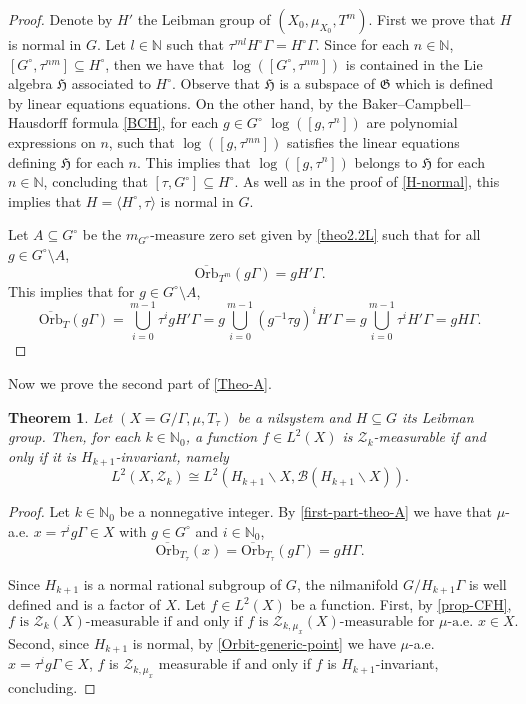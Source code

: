\documentclass[letter, 11pt]{article}
\newtheorem{theorem}{Theorem}[section]
\theoremstyle{definition}
\theoremstyle{plain}
\newcommand{\N}{\mathbb{N}}
\newcommand{\1}{\mathbbm{1}}
\begin{document}
\begin{proof}
Denote by $H'$ the Leibman group of $(X_0,\mu_{X_0},T^m)$. First we prove that $H$ is normal in $G$. Let $l\in \N$ such that $\tau^{ml}H^{\circ}\Gamma =H^{\circ}\Gamma$. Since for each $n\in \N$, $[G^{\circ},\tau^{nm}]\subseteq H^{\circ}$, then we have that $\log([G^{\circ},\tau^{nm}])$ is contained in the Lie algebra $\mathfrak{H}$ associated to $H^{\circ}$. Observe that $\mathfrak{H}$ is a subspace of $\mathfrak{G}$ which is defined by linear equations equations. On the other hand, by the Baker–Campbell–Hausdorff formula \cref{BCH}, for each $g\in G^{\circ}$ 
$\log([g,\tau^{n}])$ are polynomial expressions on $n$, such that $\log([g,\tau^{mn}])$ satisfies the linear equations defining $\mathfrak{H}$ for each $n$. This implies that $\log([g,\tau^n])$ belongs to $\mathfrak{H}$ for each $n\in\N$, concluding that $[\tau,G^{\circ}]\subseteq H^{\circ}$. As well as in the proof of \cref{H-normal}, this implies that $H=\langle  H^{\circ}, \tau\rangle$ is normal in $G$.

Let $A\subseteq G^{\circ}$ be the $m_{G^{\circ}}$-measure zero set given by \cref{theo2.2L} such that for all $g\in G^{\circ}\setminus A$,
    $$\overline{\mathrm{Orb}}_{T^m}(g\Gamma)=gH'\Gamma. $$
    This implies that for $g\in G^{\circ}\setminus A$,
    $$ \overline{\mathrm{Orb}}_{T}(g\Gamma)=\bigcup_{i=0}^{m-1}\tau^i gH'\Gamma=g \bigcup_{i=0}^{m-1}(g^{-1}\tau g)^iH' \Gamma =g \bigcup_{i=0}^{m-1}\tau^iH' \Gamma =g H\Gamma .$$
\end{proof}
Now we prove the second part of \cref{Theo-A}.
\begin{theorem}\label{Theo-A-part-2}
Let $(X=G/\Gamma,\mu,T_{\tau})$ be a nilsystem and $H\subseteq G$ its Leibman group. Then, for each $k\in \N_0$, a function $f\in L ^2(X)$ is $\mathcal{Z}_k$-measurable if and only if it is $H_{k+1}$-invariant, namely
    \begin{equation*}
       L^2(X,\mathcal{Z}_k) \cong L^2(H_{k+1}\backslash X,\mathcal{B}(H_{k+1}\backslash X)).
    \end{equation*}
\end{theorem}
\begin{proof}
Let $k\in \N_0$ be a nonnegative integer. By \cref{first-part-theo-A} we have that $\mu$-a.e. $x=\tau^{i}g\Gamma\in X$ with $g\in G^{\circ}$ and $i\in \N_0$,
\begin{equation}\label{Orbit-generic-point}
    \overline{\mathrm{Orb}}_{T_\tau}(x)= \overline{\mathrm{Orb}}_{T_\tau}(g\Gamma)=  gH \Gamma .
\end{equation}

Since $H_{k+1}$ is a normal rational subgroup of $G$, the nilmanifold $ G/H_{k+1}\Gamma$ is well defined and is a factor of $X$. Let $f\in L^2(X)$ be a function. First, by \cref{prop-CFH}, 
$$f \text{ is }\mathcal{Z}_k(X)\text{-measurable if and only if }f \text{ is } \mathcal{Z}_{k,\mu_x}(X) \text{-measurable for } \mu\text{-a.e. }x\in X.$$
 Second, since $H_{k+1}$ is normal, by \cref{Orbit-generic-point} we have $\mu$-a.e. $x=\tau^{i} g\Gamma\in X$, $f$ is $\mathcal{Z}_{k,\mu_x}$ measurable if and only if $f$ is $H_{k+1}$-invariant, concluding.
\end{proof}
\end{document}
